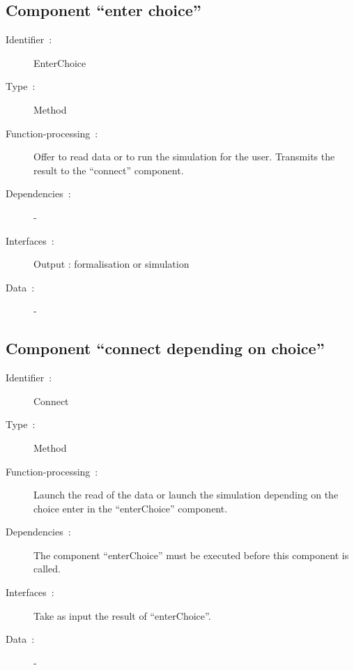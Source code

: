 	\subsection{Component ``enter choice''}
		
		\begin{description}
	
		\item[Identifier~:]EnterChoice
		\item[Type~:]Method
		\item[Function-processing~:]Offer to read data or to run the simulation for the user. Transmits the result to the ``connect'' component.
		\item[Dependencies~:]-
		\item[Interfaces~:]Output : formalisation or simulation
		\item[Data~:]-

		\end{description}
	
	
  	\subsection{Component ``connect depending on choice''}
	
		\begin{description}
	
		\item[Identifier~:]Connect
		\item[Type~:]Method
		\item[Function-processing~:]Launch the read of the data or launch the simulation depending on the choice enter in the ``enterChoice'' component.
		\item[Dependencies~:]The component  ``enterChoice'' must be executed before this component is called.
		\item[Interfaces~:]Take as input the result of ``enterChoice''.
		\item[Data~:]-

		\end{description}

	

